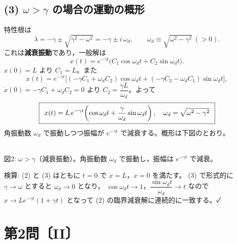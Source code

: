 \documentclass[11pt,a4paper]{article}
\begin{document}
\subsection*{(3) $\omega>\gamma$ の場合の運動の概形}
特性根は
\[
  \lambda=-\gamma\pm\sqrt{\gamma^2-\omega^2}
        =-\gamma\pm i\,\omega_d,\qquad
  \omega_d\equiv\sqrt{\omega^2-\gamma^2}\ (>0).
\]
これは\textbf{減衰振動}であり，一般解は
\[
  x(t)=e^{-\gamma t}\bigl(C_1\cos\omega_d t+C_2\sin\omega_d t\bigr).
\]
$x(0)=L$ より $C_1=L$。また
\[
  \dot{x}(t)=e^{-\gamma t}\bigl[(-\gamma C_1+\omega_d C_2)\cos\omega_d t
            +(-\gamma C_2-\omega_d C_1)\sin\omega_d t\bigr],
\]
$\dot{x}(0)=-\gamma C_1+\omega_d C_2=0$ より $C_2=\dfrac{\gamma L}{\omega_d}$。よって
\[
  \boxed{\,\;x(t)=L\,e^{-\gamma t}\!\left(\cos\omega_d t+\dfrac{\gamma}{\omega_d}\sin\omega_d t\right),\quad
  \omega_d=\sqrt{\omega^2-\gamma^2}\;\,}
\]
角振動数 $\omega_d$ で振動しつつ振幅が $e^{-\gamma t}$ で減衰する。概形は下図のとおり。

\begin{center}
\\
{\small 図2: $\omega>\gamma$（減衰振動）。角振動数 $\omega_d$ で振動し，振幅は $e^{-\gamma t}$ で減衰。}
\end{center}

\medskip
検算: (2) と (3) はともに $t=0$ で $x=L$，$\dot{x}=0$ を満たす。
(3) で形式的に $\gamma\to\omega$ とすると $\omega_d\to0$ となり，
$\cos\omega_d t\to1$，$\dfrac{\sin\omega_d t}{\omega_d}\to t$ なので
$x\to L e^{-\gamma t}(1+\gamma t)$ となって (2) の臨界減衰解に連続的に一致する。✓

\clearpage
\section*{第2問〔II〕}
\end{document}
